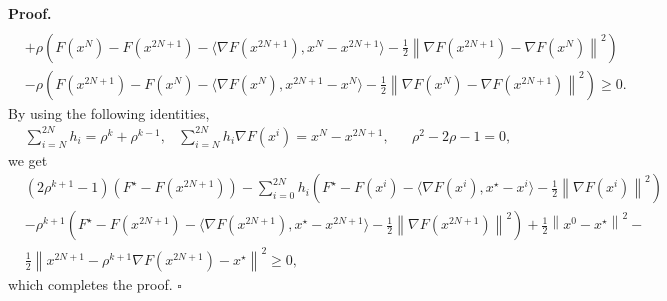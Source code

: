 \documentclass[10pt,a4paper]{amsart}
\renewenvironment{proof}[1]{\par\medskip\noindent\textbf{#1}\enspace\ignorespaces}{\par\medskip}
\newcommand{\f}[1]{F(x^{#1})}
\newcommand{\g}[1]{\nabla F(x^{#1})}
\newenvironment{proof}{\proof{Proof.}}{\endproof}
\newcommand{\Halmos}{\hfill$\square$}
\begin{document}
\begin{proof}{Proof.}
\begin{align*}
\\ 
& +\rho\left(  \f{N}-\f{2N+1}-\langle \g{2N+1}, x^{N}-x^{2N+1}\rangle-\tfrac{1}{2}\left\| \g{2N+1}-\g{N}\right\|^2 \right)
\\
& -\rho\left( \f{2N+1}-\f{N}-\langle \g{N},x^{2N+1}-x^{N}\rangle-\tfrac{1}{2}\left\| \g{N}-\g{2N+1}\right\|^2 \right)
\geq 0.
\end{align*}
By using the following identities,
\begin{align*}
&  \sum_{i=N}^{2N} h_i=\rho^k+\rho^{k-1}, & \sum_{i=N}^{2N}h_i\g{i}=x^{N}-x^{2N+1},& 
& \rho^2-2\rho-1=0, 
\end{align*}
 we get
 \begin{align*}
\nonumber & \left(2\rho^{k+1}-1\right)\left(F^\star-\f{2N+1}\right)-
\sum_{i=0}^{2N}h_i\left(  F^\star-\f{i}-\langle \g{i}, x^\star-x^i\rangle-\tfrac{1}{2}\left\| \g{i} \right\|^2 \right)\\
& -\rho^{k+1}\left(  F^\star-\f{2N+1}-\langle \g{2N+1}, x^\star-x^{2N+1}\rangle-\tfrac{1}{2}\left\| \g{2N+1}\right\|^2 \right)+
\tfrac{1}{2}\left\|x^0-x^\star\right\|^2-\\
&\tfrac{1}{2}\left\| x^{2N+1}-\rho^{k+1} \g{2N+1}-x^\star\right\|^2 \geq 0,
\end{align*}
which completes the proof. 
\Halmos
\end{proof}
\end{document}
